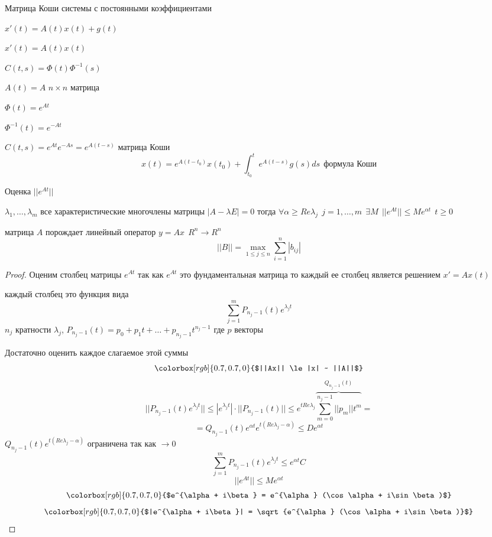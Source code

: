 \begin{title}[\Large]
  Матрица Коши системы с постоянными коэффициентами
\end{title}

\begin{define}
  $x'(t) = A(t)x(t) + g(t)$

  $x'(t) = A(t)x(t)$

  $C(t,s) = \Phi(t) \Phi^{-1}(s)$

  $A(t) = A$ $n \times n$ матрица

  $\Phi(t) = e^{At}$

  $\Phi^{-1}(t) = e^{-At}$

  $C(t,s) = e^{At} e^{-As} = e^{A(t-s)}$ матрица Коши
  $$
  x(t) = e^{A(t-t_0)}x(t_0) + \int_{t_0}^t e^{A(t-s)}g(s)ds ~~ \text{формула
  Коши}
  $$
\end{define}

\begin{title}[\Large]
  Оценка $||e^{At}||$
\end{title}

\begin{theorem}
  $\lambda_1, \ldots, \lambda_m$ все характеристические многочлены матрицы
  $|A - \lambda E| = 0$ тогда $\forall \alpha \ge Re\lambda_j ~~
  j = 1, \ldots, m ~~ \exists M ~~ ||e^{At}|| \le Me^{\alpha t} ~~ t \ge 0$

  матрица $A$ порождает линейный оператор $y=Ax ~~ R^n \to R^n$
  $$
  ||B|| = \max_{1 \le j \le n} \sum_{i=1}^n |b_{ij}|
  $$
\end{theorem}

\begin{proof}
  Оценим столбец матрицы $e^{At}$ так как $e^{At}$ это фундаментальная матрица
  то каждый ее столбец является решением $x'=Ax(t)$

  каждый столбец это функция вида
  $$
  \sum_{j=1}^m P_{n_j-1}(t) e^{\lambda_j t}
  $$
  $n_j$ кратности $\lambda_j$, $P_{n_j-1}(t) = p_0 + p_1t + \ldots +
  p_{n_j-1}t^{n_j-1}$ где $p$ векторы

  Достаточно оценить каждое слагаемое этой суммы
  $$
  \colorbox[rgb]{0.7,0.7,0}{$||Ax|| \le |x| ~ ||A||$}
  $$
  $$
  ||P_{n_j-1}(t)e^{\lambda_j t}|| \le |e^{\lambda_j t}|\cdot||P_{n_j-1}(t)||\le
  e^{tRe\lambda_j} \overbrace{\sum_{m=0}^{n_j-1} ||p_m||t^m}^{Q_{n_j-1}(t)} =
  $$
  $$
  = Q_{n_j-1}(t)e^{\alpha t} e^{t(Re\lambda_j-\alpha)} \le De^{\alpha t}
  $$
  $Q_{n_j-1}(t)e^{t(Re\lambda_j-\alpha)}$ ограничена так как $\to 0$
  $$
  \sum_{j=1}^m P_{n_j-1}(t)e^{\lambda_j t} \le e^{\alpha t} C
  $$
  $$
  ||e^{At}|| \le Me^{\alpha t}
  $$
  $$
  \colorbox[rgb]{0.7,0.7,0}{$e^{\alpha + i\beta} = e^{\alpha} (\cos \alpha +
  i\sin \beta)$}
  $$
  $$
  \colorbox[rgb]{0.7,0.7,0}{$|e^{\alpha + i\beta}| = \sqrt{e^{\alpha}
  (\cos \alpha + i\sin \beta)}$}
  $$
\end{proof}

